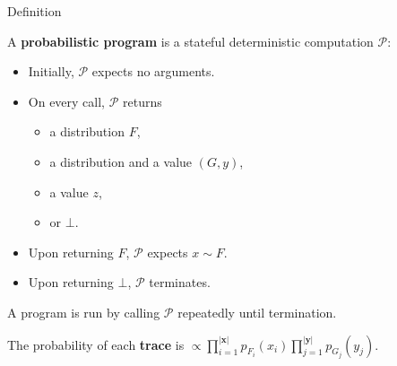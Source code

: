 \begin{frame}{Definition}

A \textbf{probabilistic program} is a stateful deterministic
computation $\mathcal{P}$:
\begin{itemize}
\item Initially, $\mathcal{P}$ expects no arguments.
\item On every call, $\mathcal{P}$ returns
    \begin{itemize}
        \item a distribution $F$,
        \item a distribution and a value $(G, y)$,
        \item a value $z$, 
        \item or $\bot$.
    \end{itemize}
\item Upon returning $F$, $\mathcal{P}$ expects $x\sim F$.
\item Upon returning $\bot$, $\mathcal{P}$ terminates.
\end{itemize}
A program is run by calling $\mathcal{P}$ repeatedly until termination.

The probability of each \textbf{trace} is $\propto\prod_{i=1}^{\left|\pmb{x}\right|} p_{F_i}(x_i) \prod_{j=1}^{\left|\pmb{y}\right|}p_{G_j}(y_{j})$.
\end{frame}
